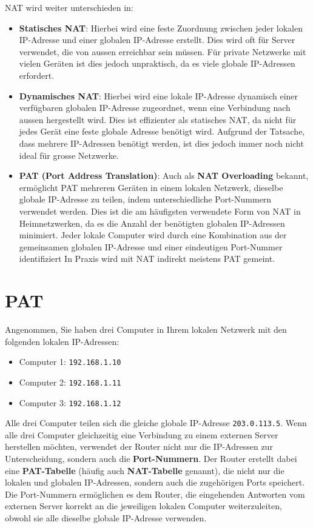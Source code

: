 \gls{NAT} wird weiter unterschieden in:
\begin{itemize}
    \item \textbf{Statisches NAT}: Hierbei wird eine feste Zuordnung zwischen jeder lokalen \gls{IP}-Adresse und einer globalen \gls{IP}-Adresse erstellt. Dies wird oft für Server verwendet, die von aussen erreichbar sein müssen. Für private Netzwerke mit vielen Geräten ist dies jedoch unpraktisch, da es viele globale \gls{IP}-Adressen erfordert.
    \item \textbf{Dynamisches NAT}: Hierbei wird eine lokale \gls{IP}-Adresse dynamisch einer verfügbaren globalen \gls{IP}-Adresse zugeordnet, wenn eine Verbindung nach aussen hergestellt wird. Dies ist effizienter als statisches \gls{NAT}, da nicht für jedes Gerät eine feste globale Adresse benötigt wird. Aufgrund der Tatsache, dass mehrere \gls{IP}-Adressen benötigt werden, ist dies jedoch immer noch nicht ideal für grosse Netzwerke.
    \item \textbf{\gls{PAT} (Port Address Translation)}: Auch als \textbf{NAT Overloading} bekannt, ermöglicht \gls{PAT} mehreren Geräten in einem lokalen Netzwerk, dieselbe globale \gls{IP}-Adresse zu teilen, indem unterschiedliche Port-Nummern verwendet werden. Dies ist die am häufigsten verwendete Form von \gls{NAT} in Heimnetzwerken, da es die Anzahl der benötigten globalen \gls{IP}-Adressen minimiert. Jeder lokale Computer wird durch eine Kombination aus der gemeinsamen globalen \gls{IP}-Adresse und einer eindeutigen Port-Nummer identifiziert In Praxis wird mit \gls{NAT} indirekt meistens \gls{PAT} gemeint.
\end{itemize}

\section{\texorpdfstring{\acrfull{PAT}}{Port Address Translation (PAT)}}
Angenommen, Sie haben drei Computer in Ihrem lokalen Netzwerk mit den folgenden lokalen \gls{IP}-Adressen:
\begin{itemize}
    \item Computer 1: \texttt{192.168.1.10}
    \item Computer 2: \texttt{192.168.1.11}
    \item Computer 3: \texttt{192.168.1.12}
\end{itemize}
Alle drei Computer teilen sich die gleiche globale \gls{IP}-Adresse \texttt{203.0.113.5}. Wenn alle drei Computer gleichzeitig eine Verbindung zu einem externen Server herstellen möchten, verwendet der Router nicht nur die \gls{IP}-Adressen zur Unterscheidung, sondern auch die \textbf{Port-Nummern}. Der Router erstellt dabei eine \textbf{\gls{PAT}-Tabelle} (häufig auch \textbf{\gls{NAT}-Tabelle} genannt), die nicht nur die lokalen und globalen \gls{IP}-Adressen, sondern auch die zugehörigen Ports speichert. Die Port-Nummern ermöglichen es dem Router, die eingehenden Antworten vom externen Server korrekt an die jeweiligen lokalen Computer weiterzuleiten, obwohl sie alle dieselbe globale \gls{IP}-Adresse verwenden.

